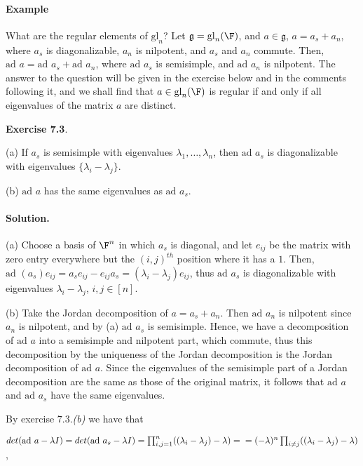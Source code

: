 \documentclass[11pt]{article}
\newcommand{\gl}{\mbox{gl}}
\newcommand{\ad}{\mbox{ad\ }}
\newcommand{\g}{\mathfrak{g}}
\newcommand{\sk}{\vspace*{1em}}
\begin{document}
\paragraph{Example} 
What are the regular elements of $\gl_n$? 
Let $\g=\gl_n(\F)$, and $a \in \g$, $a=a_s+a_n$, where $a_s$ is diagonalizable, $a_n$ is nilpotent, and $a_s$ and $a_n$ commute. Then, $\ad a=\ad a_s+\ad a_n$, where $\ad a_s$ is semisimple, and $\ad a_n$ is nilpotent. The answer to the question will be given in the exercise below and in the comments following it, and we shall find that     $a \in \gl_n(\F)$ is regular if and only if all eigenvalues of the matrix $a$ are distinct.


\sk\noindent
{\bf Exercise 7.3}.

(a) If  $a_{s}$ is semisimple with eigenvalues $\lambda_{1},\dots,\lambda_{n}$,
then $\ad a_{s}$ is diagonalizable with eigenvalues $\{\lambda_{i}-\lambda_{j}\}$.

(b) $\ad a$ has the same eigenvalues as $\ad a_{s}$.



\paragraph{Solution.}

(a) Choose a  basis of ${\F}^n$ in which $a_{s}$ is diagonal, and let
 $e_{ij}$ be the matrix with zero entry  everywhere but
the $(i,j)^{th}$ position where it has a $1$. Then, $\ad (a_s) e_{ij}= 
a_{s}e_{ij}-e_{ij}a_{s}=(\lambda_{i}-\lambda_{j})e_{ij}$, 
thus  $\ad a_{s}$ is diagonalizable with eigenvalues $\lambda_{i}-\lambda_{j}$, $i, j \in [n]$.

(b) Take the Jordan decomposition of $a=a_{s}+a_{n}$. Then
$\ad a_{n}$ is nilpotent since $a_n$ is nilpotent, 
and by (a) $\ad a_{s}$ is semisimple. Hence, we have a decomposition of $\ad a$ into
a semisimple and nilpotent part, which commute,  thus this decomposition  by the uniqueness of the Jordan
decomposition is the Jordan decomposition of $\ad a$.
Since  the eigenvalues of the
semisimple part of a Jordan decomposition are the same as those of
the original matrix, it follows that $\ad a$ and $\ad a_s$ have the same eigenvalues.



By exercise $7.3.$\textit{(b)} we have that 
 
$det(\ad a-\lambda I)=det(\ad a_{s}-\lambda I)
=\prod_{i,j=1}^{n}((\lambda_{i}-\lambda_{j})-\lambda)=\\
=(-\lambda)^{n}\prod_{i\ne j}((\lambda_{i}-\lambda_{j})-\lambda)$,
\end{document}
